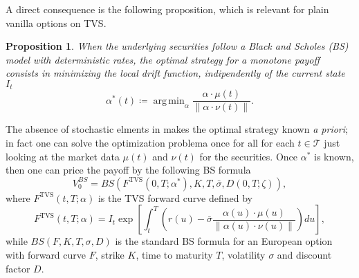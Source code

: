 \documentclass[11pt]{article}
\newtheorem{proposition}[theorem]{Proposition}
\DeclareMathOperator*{\argmin}{arg\,min}
\begin{document}
A direct consequence is the following proposition, which is relevant for plain vanilla options on TVS.

\begin{proposition}
When the underlying securities follow a Black and Scholes (BS) model with deterministic rates, the optimal strategy for a monotone payoff consists in minimizing the local drift function, indipendently of the current state $I_t$
\begin{equation}
    \alpha^*(t) \coloneqq \argmin_\alpha \frac{\alpha \cdot \mu(t)}{\|\alpha \cdot \nu(t) \|}.
\label{eq:BS_optimal_strategy}\end{equation}
\end{proposition}
The absence of stochastic elments in  makes the optimal strategy known \textit{a priori}; in fact one can solve the optimization problema once for all for each $t \in \mathcal{T}$ just looking at the market data $\mu(t)$ and $\nu(t)$ for the securities. Once $\alpha^*$ is known, then one can price the payoff by the following BS formula
\begin{equation}
	V_0^{BS} = BS(F^{\text{TVS}}(0,T;\alpha^*), K, T, \bar{\sigma}, D(0,T;\zeta)),
\end{equation}
where $F^{\text{TVS}}(t,T;\alpha)$ is the TVS forward curve defined by
\begin{equation}
	F^{\text{TVS}}(t,T;\alpha) = I_t \exp\left[\int_t^T\left(r(u)-\bar{\sigma}\frac{\alpha(u)\cdot \mu(u)}{\|\alpha(u)\cdot \nu(u)\|}\right)du\right],
\end{equation}
while $BS(F,K,T,\sigma,D)$ is the standard BS formula for an European option with forward curve $F$, strike $K$, time to maturity $T$, volatility $\sigma$ and discount factor $D$.  
\end{document}
